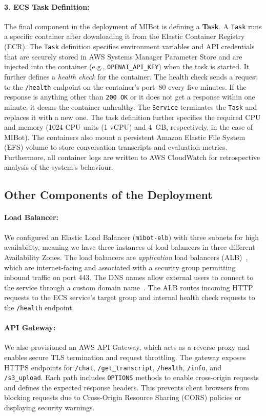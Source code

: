 \paragraph{3. ECS Task Definition:}The final component in the deployment of MIBot is defining a \textbf{Task}. A \texttt{Task} runs a specific container after downloading it from the Elastic Container Registry (ECR). The \texttt{Task} definition specifies environment variables and API credentials that are securely stored in AWS Systems Manager Parameter Store and are injected into the container (e.g., \texttt{OPENAI\_API\_KEY}) when the task is started. It further defines a \emph{health check} for the container. The health check sends a request to the \texttt{/health} endpoint on the container's port~80 every five minutes. If the response is anything other than \texttt{200 OK} or it does not get a response within one minute, it deems the container unhealthy. The \texttt{Service} terminates the \texttt{Task} and replaces it with a new one. The task definition further specifies the required CPU and memory (1024 CPU units (1 vCPU) and 4~GB, respectively, in the case of MIBot). The containers also mount a persistent Amazon Elastic File System (EFS) volume to store conversation transcripts and evaluation metrics. Furthermore, all container logs are written to AWS CloudWatch for retrospective analysis of the system's behaviour.

\subsection{Other Components of the Deployment}

\paragraph{Load Balancer:}We configured an Elastic Load Balancer (\texttt{mibot-elb}) with three subnets for high availability, meaning we have three instances of load balancers in three different Availability Zones. The load balancers are \emph{application} load balancers (ALB)~\citep{aws_alb}, which are internet-facing and associated with a security group permitting inbound traffic on port 443. The DNS names allow external users to connect to the service through a custom domain name~\citep{shopify_domain_seo}. The ALB routes incoming HTTP requests to the ECS service's target group and internal health check requests to the \texttt{/health} endpoint.

\paragraph{API Gateway:}We also provisioned an AWS API Gateway, which acts as a reverse proxy and enables secure TLS termination and request throttling. The gateway exposes HTTPS endpoints for \texttt{/chat}, \texttt{/get\_transcript}, \texttt{/health}, \texttt{/info}, and \texttt{/s3\_upload}. Each path includes \texttt{OPTIONS} methods to enable cross-origin requests and defines the expected response headers. This prevents client browsers from blocking requests due to Cross-Origin Resource Sharing (CORS) policies or displaying security warnings.

